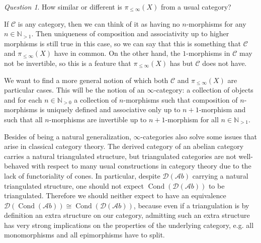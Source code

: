 \documentclass[11pt,A4]{article}
\theoremstyle{plain}
\theoremstyle{definition}
\theoremstyle{remark}
\newtheorem{q}[thm]{Question}
\newcommand{\N}{\mathbb{N}}
\newcommand{\1}{\mathbbm{1}}
\newcommand{\C}{\mathscr{C}}
\newcommand{\Ab}{\mathscr{A}b}
\newcommand{\D}{\mathscr{D}}
\DeclareMathOperator{\Cond}{Cond}
\begin{document}
\begin{q}
    How similar or different is $\pi_{\leqslant \infty}(X)$ from a usual category?
\end{q}

If $\C$ is any category, then we can think of it as having no $n$-morphisms for any $n\in \N_{>1}$.
Then uniqueness of composition and associativity up to higher morphisms is still true in this case, so we can say that this is something that $\C$ and $\pi_{\leqslant \infty }(X)$ have in common.
On the other hand, the $1$-morphisms in $\C$ may not be invertible, so this is a feature that $\pi_{\leqslant \infty}(X)$ has but $\C$ does not have.

We want to find a more general notion of which both $\C$ and $\pi_{\leqslant \infty}(X)$ are particular cases.
This will be the notion of an $\infty$-category: a collection of objects and for each $n\in \N_{>0}$ a collection of $n$-morphisms such that composition of $n$-morphisms is uniquely defined and associative only up to $n+1$-morphism and such that all $n$-morphisms are invertible up to $n+1$-morphism for all $n\in\N_{>1}$.

Besides of being a natural generalization, $\infty$-categories also solve some issues that arise in classical category theory.
The derived category of an abelian category carries a natural triangulated structure, but triangulated categories are not well-behaved with respect to many usual constructions in category theory due to the lack of functoriality of cones.
In particular, despite $\D(\Ab)$ carrying a natural triangulated structure, one should not expect $\Cond(\D(\Ab))$ to be triangulated.
Therefore we should neither expect to have an equivalence $\D(\Cond(\Ab))\cong \Cond(\D(\Ab))$, because even if a triangulation is by definition an extra structure on our category, admitting such an extra structure has very strong implications on the properties of the underlying category, e.g. all monomorphisms and all epimorphisms have to split.



\end{document}
